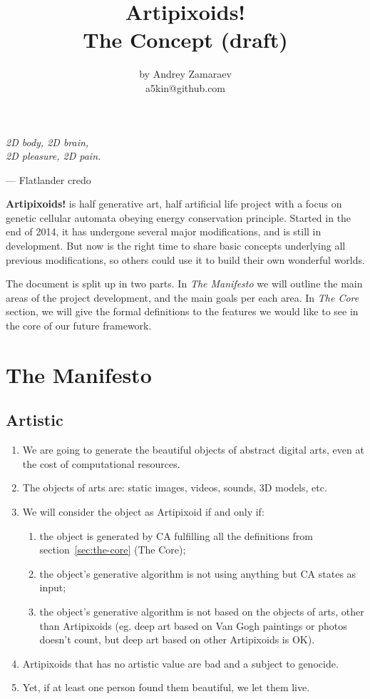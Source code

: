 \documentclass[a4paper,12pt,tikz,UTF8]{article}
\title{\bf Artipixoids!\\\large The Concept (draft)}
\author{by Andrey Zamaraev\\a5kin@github.com}
\begin{document}
  \maketitle

  \epigraph{
    \it 2D body, 2D brain,\\
    2D pleasure, 2D pain.
  }{--- Flatlander credo}

  \textbf{Artipixoids!} is half generative art, half artificial life project with a focus on genetic cellular automata obeying energy conservation principle. Started in the end of 2014, it has undergone several major modifications, and is still in development. But now is the right time to share basic concepts underlying all previous modifications, so others could use it to build their own wonderful worlds.

  The document is split up in two parts. In \textit{The Manifesto} we will outline the main areas of the project development, and the main goals per each area. In \textit{The Core} section, we will give the formal definitions to the features we would like to see in the core of our future framework. 

  \newpage
  \tableofcontents

  \newpage
  \section{The Manifesto}

  \subsection{Artistic}

    \begin{enumerate}
      \item We are going to generate the beautiful objects of abstract digital arts, even at the cost of computational resources.
      \item The objects of arts are: static images, videos, sounds, 3D models, etc.
      \item We will consider the object as Artipixoid if and only if:
        \begin{enumerate}
          \item the object is generated by CA fulfilling all the definitions from section~\ref{sec:the-core} (The Core);
          \item the object's generative algorithm is not using anything but CA states as input;
          \item the object's generative algorithm is not based on the objects of arts, other than Artipixoids (eg. deep art based on Van Gogh paintings or photos doesn't count, but deep art based on other Artipixoids is OK).
        \end{enumerate}
      \item Artipixoids that has no artistic value are bad and a subject to genocide.
      \item Yet, if at least one person found them beautiful, we let them live.
    \end{enumerate}
\end{document}

